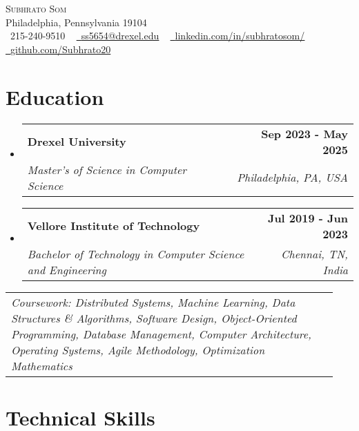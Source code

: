 \documentclass[letterpaper,11pt]{article}
\makeatletter
\newcommand{\resumeSubheading}[4]{
  \vspace{-2pt}\item
    \begin{tabular*}{1.0\textwidth}[t]{l@{\extracolsep{\fill}}r}
      \textbf{#1} & \textbf{\small #2} \\
      \textit{\small#3} & \textit{\small #4} \\
    \end{tabular*}\vspace{-7pt}
}
\newcommand{\resumeSubHeadingListStart}{\begin{itemize}[leftmargin=0.0in, label={}]}
\newcommand{\resumeSubHeadingListEnd}{\end{itemize}}
\makeatother
\begin{document}

\vspace{-16pt}
\begin{center}
    {\Huge \scshape Subhrato Som} \\ \vspace{1pt}
    Philadelphia, Pennsylvania 19104 \\ \vspace{1pt}
    \small \raisebox{-0.1\height}\faPhone\ 215-240-9510 ~ \href{mailto:ss5654@drexel.edu}{\raisebox{-0.2\height}\faEnvelope\  \underline{ss5654@drexel.edu}} ~ 
    \href{https://linkedin.com/in/subhratosom/}{\raisebox{-0.2\height}\faLinkedin\ \underline{linkedin.com/in/subhratosom/}}  ~
    \href{https://github.com/Subhrato20}{\raisebox{-0.2\height}\faGithub\ \underline{github.com/Subhrato20}}
    \vspace{-8pt}
\end{center}

\section{Education}
  \resumeSubHeadingListStart
  
    \resumeSubheading
      {Drexel University}{Sep 2023 - May 2025}
      {Master's of Science in Computer Science}{Philadelphia, PA, USA}

    \vspace{-5pt}
    \resumeSubheading
      {Vellore Institute of Technology}{Jul 2019 - Jun 2023}
      {Bachelor of Technology in Computer Science and Engineering}{Chennai, TN, India}
  
  \resumeSubHeadingListEnd
  \vspace{0.2em}
    \hspace{0.15in}\begin{tabular}{p{0.94\linewidth}}
    \textit{{Coursework}: Distributed Systems, Machine Learning, Data Structures \& Algorithms, Software Design, Object-Oriented Programming, Database Management, Computer Architecture, Operating Systems, Agile Methodology, Optimization Mathematics}
\end{tabular}

\section{Technical Skills}
\end{document}
